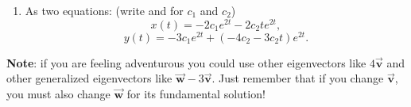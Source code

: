\begin{enumerate}
\begin{enumerate}[label=\textbf{\Alph*.}]
\[\begin{bmatrix}
    \end{bmatrix}.
    \]
    \begin{subanswer}
    \end{subanswer}
    \item As two equations: (write  and  for $c_1$ and $c_2$)\\
    \[
    x(t) = -2c_{1}e^{2t} - 2c_{2}t e^{2t},
    \]
    \[
    y(t) = -3c_{1}e^{2t} + (-4c_{2} - 3c_{2}t)e^{2t}.
    \]
    \begin{subanswer}
    \end{subanswer}
  \end{enumerate}

  \textbf{Note}: if you are feeling adventurous you could use other 
  eigenvectors like $4 \overrightarrow{\boldsymbol{v}}$ and other 
  generalized eigenvectors like $\overrightarrow{\boldsymbol{w}}-3 \overrightarrow{\boldsymbol{v}}$. 
  Just remember that if you change $\overrightarrow{\boldsymbol{v}}$, 
  you must also change $\overrightarrow{\boldsymbol{w}}$ for its fundamental solution!

  \newpage


\end{enumerate}
